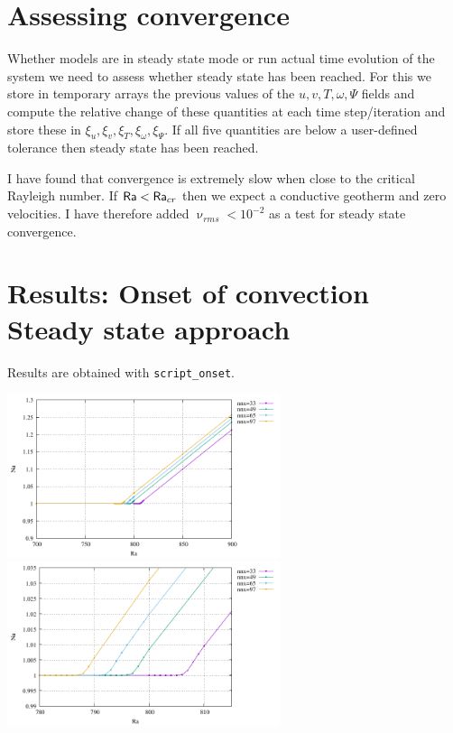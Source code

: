\section*{Assessing convergence}

Whether models are in steady state mode or run actual time evolution of the system
we need to assess whether steady state has been reached. 
For this we store in temporary arrays the previous values of the $u,v,T,\omega,\Psi$ 
fields and compute the relative change of these quantities at each time step/iteration
and store these in $\xi_u,\xi_v,\xi_T,\xi_\omega,\xi_\Psi$. If all five quantities
are below a user-defined tolerance then steady state has been reached. 

I have found that convergence is extremely slow when close to the critical Rayleigh number. 
If ${\mathsf{Ra}}<{\mathsf{Ra}}_{cr}$ then we expect a conductive geotherm and zero velocities. 
I have therefore added $\upnu_{rms}<10^{-2}$ as a test for steady state convergence. 


\section*{Results: Onset of convection Steady state approach}

Results are obtained with {\tt script\_onset}. 

\begin{center}
\includegraphics[width=8cm]{python_codes/fieldstone_155/results_onset/Ra_Nu.pdf}
\includegraphics[width=8cm]{python_codes/fieldstone_155/results_onset/Ra_Nu_zoom.pdf}
\end{center}


